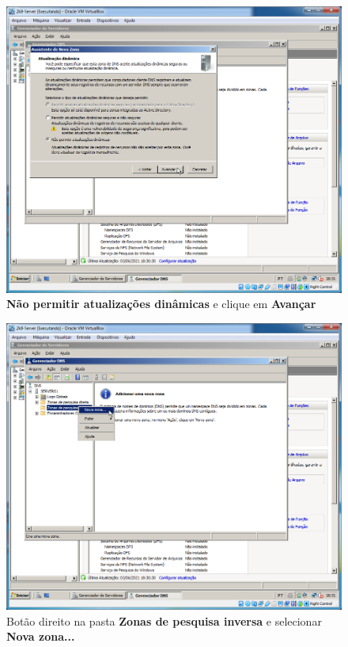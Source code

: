 \documentclass[10pt]{article}
\begin{document}
\begin{figure}[H]
    \centering
    \caption{\textbf{Não permitir atualizações dinâmicas} e clique em \textbf{Avançar}}
    \label{fig:DNS018}
    \includegraphics[width=\linewidth]{images/windows_server/dns/018.png}
\end{figure}
\begin{figure}[H]
    \centering
    \caption{Botão direito na pasta \textbf{Zonas de pesquisa inversa} e selecionar \textbf{Nova zona...}}
    \label{fig:DNS020}
    \includegraphics[width=\linewidth]{images/windows_server/dns/020.png}
\end{figure}
\end{document}
